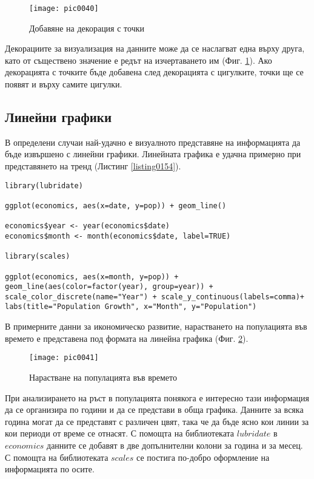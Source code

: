 \begin{figure}[h!]
  \centering
  \texttt{[image: pic0040]}
  \caption{Добавяне на декорация с точки}
\label{figure0040}
\end{figure}
\FloatBarrier

Декорациите за визуализация на данните може да се наслагват една върху друга, като от съществено значение е редът на изчертаването им (Фиг. \ref{figure0040}). Ако декорацията с точките бъде добавена след декорацията с цигулките, точки ще се появят и върху самите цигулки. 

\subsection{Линейни графики}

В определени случаи най-удачно е визуалното представяне на информацията да бъде извършено с линейни графики. Линейната графика е удачна примерно при представянето на тренд (Листинг \ref{listing0154}).

\begin{lstlisting}[caption=Линейни графики, label=listing0154]
library(lubridate)

ggplot(economics, aes(x=date, y=pop)) + geom_line()

economics$year <- year(economics$date)
economics$month <- month(economics$date, label=TRUE)

library(scales)

ggplot(economics, aes(x=month, y=pop)) + geom_line(aes(color=factor(year), group=year)) + scale_color_discrete(name="Year") + scale_y_continuous(labels=comma)+ labs(title="Population Growth", x="Month", y="Population")
\end{lstlisting}

В примерните данни за икономическо развитие, нарастването на популацията във времето е представена под формата на линейна графика (Фиг. \ref{figure0041}).

\begin{figure}[h!]
  \centering
  \texttt{[image: pic0041]}
  \caption{Нарастване на популацията във времето}
\label{figure0041}
\end{figure}
\FloatBarrier

При анализирането на ръст в популацията понякога е интересно тази информация да се организира по години и да се представи в обща графика. Данните за всяка година могат да се представят с различен цвят, така че да бъде ясно кои линии за кои периоди от време се отнасят. С помощта на библиотеката $lubridate$ в $economics$ данните се добавят в две допълнителни колони за година и за месец. С помощта на библиотеката $scales$ се постига по-добро оформление на информацията по осите. 

